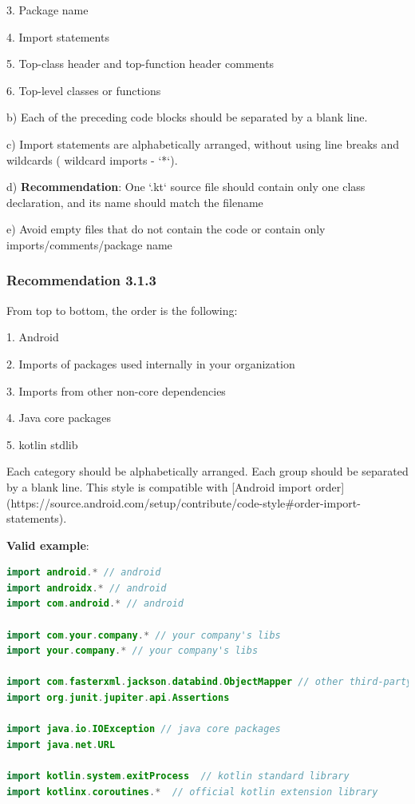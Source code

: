 3.	Package name

4.	Import statements

5.	Top-class header and top-function header comments

6.	Top-level classes or functions



b) Each of the preceding code blocks should be separated by a blank line.



c) Import statements are alphabetically arranged, without using line breaks and wildcards ( wildcard imports - `*`).



d) \textbf{Recommendation}: One `.kt` source file should contain only one class declaration, and its name should match the filename



e) Avoid empty files that do not contain the code or contain only imports/comments/package name



\subsubsection*{\textbf{Recommendation 3.1.3}}
\leavevmode\newline



From top to bottom, the order is the following:

1. Android

2. Imports of packages used internally in your organization

3. Imports from other non-core dependencies

4. Java core packages

5. kotlin stdlib



Each category should be alphabetically arranged. Each group should be separated by a blank line. This style is compatible with  [Android import order](https://source.android.com/setup/contribute/code-style\#order-import-statements).



\textbf{Valid example}:

\begin{lstlisting}[language=Kotlin]
import android.* // android
import androidx.* // android
import com.android.* // android

import com.your.company.* // your company's libs
import your.company.* // your company's libs

import com.fasterxml.jackson.databind.ObjectMapper // other third-party dependencies
import org.junit.jupiter.api.Assertions

import java.io.IOException // java core packages
import java.net.URL

import kotlin.system.exitProcess  // kotlin standard library
import kotlinx.coroutines.*  // official kotlin extension library
\end{lstlisting}



